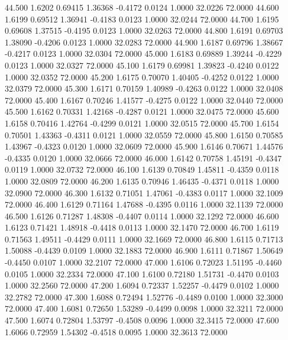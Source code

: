   44.500   1.6202   0.69415   1.36368  -0.4172   0.0124   1.0000  32.0226  72.0000
  44.600   1.6199   0.69512   1.36941  -0.4183   0.0123   1.0000  32.0244  72.0000
  44.700   1.6195   0.69608   1.37515  -0.4195   0.0123   1.0000  32.0263  72.0000
  44.800   1.6191   0.69703   1.38090  -0.4206   0.0123   1.0000  32.0283  72.0000
  44.900   1.6187   0.69796   1.38667  -0.4217   0.0123   1.0000  32.0304  72.0000
  45.000   1.6183   0.69889   1.39244  -0.4229   0.0123   1.0000  32.0327  72.0000
  45.100   1.6179   0.69981   1.39823  -0.4240   0.0122   1.0000  32.0352  72.0000
  45.200   1.6175   0.70070   1.40405  -0.4252   0.0122   1.0000  32.0379  72.0000
  45.300   1.6171   0.70159   1.40989  -0.4263   0.0122   1.0000  32.0408  72.0000
  45.400   1.6167   0.70246   1.41577  -0.4275   0.0122   1.0000  32.0440  72.0000
  45.500   1.6162   0.70331   1.42168  -0.4287   0.0121   1.0000  32.0475  72.0000
  45.600   1.6158   0.70416   1.42764  -0.4299   0.0121   1.0000  32.0515  72.0000
  45.700   1.6154   0.70501   1.43363  -0.4311   0.0121   1.0000  32.0559  72.0000
  45.800   1.6150   0.70585   1.43967  -0.4323   0.0120   1.0000  32.0609  72.0000
  45.900   1.6146   0.70671   1.44576  -0.4335   0.0120   1.0000  32.0666  72.0000
  46.000   1.6142   0.70758   1.45191  -0.4347   0.0119   1.0000  32.0732  72.0000
  46.100   1.6139   0.70849   1.45811  -0.4359   0.0118   1.0000  32.0809  72.0000
  46.200   1.6135   0.70946   1.46435  -0.4371   0.0118   1.0000  32.0900  72.0000
  46.300   1.6132   0.71051   1.47061  -0.4383   0.0117   1.0000  32.1009  72.0000
  46.400   1.6129   0.71164   1.47688  -0.4395   0.0116   1.0000  32.1139  72.0000
  46.500   1.6126   0.71287   1.48308  -0.4407   0.0114   1.0000  32.1292  72.0000
  46.600   1.6123   0.71421   1.48918  -0.4418   0.0113   1.0000  32.1470  72.0000
  46.700   1.6119   0.71563   1.49511  -0.4429   0.0111   1.0000  32.1669  72.0000
  46.800   1.6115   0.71713   1.50088  -0.4439   0.0109   1.0000  32.1883  72.0000
  46.900   1.6111   0.71867   1.50649  -0.4450   0.0107   1.0000  32.2107  72.0000
  47.000   1.6106   0.72023   1.51195  -0.4460   0.0105   1.0000  32.2334  72.0000
  47.100   1.6100   0.72180   1.51731  -0.4470   0.0103   1.0000  32.2560  72.0000
  47.200   1.6094   0.72337   1.52257  -0.4479   0.0102   1.0000  32.2782  72.0000
  47.300   1.6088   0.72494   1.52776  -0.4489   0.0100   1.0000  32.3000  72.0000
  47.400   1.6081   0.72650   1.53289  -0.4499   0.0098   1.0000  32.3211  72.0000
  47.500   1.6074   0.72804   1.53797  -0.4508   0.0096   1.0000  32.3415  72.0000
  47.600   1.6066   0.72959   1.54302  -0.4518   0.0095   1.0000  32.3613  72.0000
